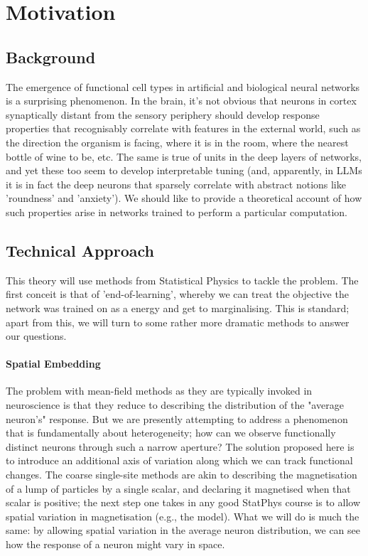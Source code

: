 \documentclass[../main.tex]{subfiles}
\begin{document}
\section{Motivation}
\label{sec:motivation}

\subsection{Background}

The emergence of functional cell types in artificial and biological neural networks is a surprising phenomenon. In the brain, it's not obvious that neurons in cortex synaptically distant from the sensory periphery should develop response properties that recognisably correlate with features in the external world, such as the direction the organism is facing, where it is in the room, where the nearest bottle of wine  to be, etc. The same is true of units in the deep layers of  networks, and yet these too seem to develop interpretable tuning (and, apparently, in LLMs it is in fact the deep neurons that sparsely correlate with abstract notions like 'roundness' and 'anxiety'). We should like to provide a theoretical account of how such properties arise in networks trained to perform a particular computation.

\subsection{Technical Approach}

This theory will use methods from Statistical Physics to tackle the problem. The first conceit is that of 'end-of-learning', whereby we can treat the objective the network was trained on as a  energy and get to marginalising. This is standard; apart from this, we will turn to some rather more dramatic methods to answer our questions.

\paragraph{Spatial Embedding}

The problem with mean-field methods as they are typically invoked in neuroscience is that they reduce to describing the distribution of the "average neuron's" response. But we are presently attempting to address a phenomenon that is fundamentally about heterogeneity; how can we observe functionally distinct neurons through such a narrow aperture? The solution proposed here is to introduce an additional axis of variation along which we can track functional changes. The coarse single-site methods are akin to describing the magnetisation of a lump of particles by a single scalar, and declaring it magnetised when that scalar is positive; the next step one takes in any good StatPhys course is to allow spatial variation in magnetisation (e.g., the  model). What we will do is much the same: by allowing spatial variation in the average neuron distribution, we can see how the response of a neuron might vary in space.
\end{document}

